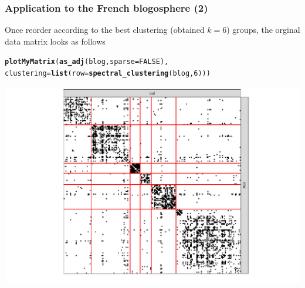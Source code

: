 \documentclass{beamer}\usepackage[]{graphicx}\usepackage[]{color}
\makeatletter
\newcommand{\hlnum}[1]{\textcolor[rgb]{0.686,0.059,0.569}{#1}}%
\newcommand{\hlstd}[1]{\textcolor[rgb]{0.345,0.345,0.345}{#1}}%
\newcommand{\hlkwc}[1]{\textcolor[rgb]{0.333,0.667,0.333}{#1}}%
\newcommand{\hlkwd}[1]{\textcolor[rgb]{0.737,0.353,0.396}{\textbf{#1}}}%
\newenvironment{kframe}{%
 \def\at@end@of@kframe{}%
 \ifinner\ifhmode%
  \def\at@end@of@kframe{\end{minipage}}%
  \begin{minipage}{\columnwidth}%
 \fi\fi%
 \def\FrameCommand##1{\hskip\@totalleftmargin \hskip-\fboxsep
 \colorbox{shadecolor}{##1}\hskip-\fboxsep
     \hskip-\linewidth \hskip-\@totalleftmargin \hskip\columnwidth}%
 \MakeFramed {\advance\hsize-\width
   \@totalleftmargin\z@ \linewidth\hsize
   \@setminipage}}%
 {\par\unskip\endMakeFramed%
 \at@end@of@kframe}
\newenvironment{knitrout}{}{} %
\makeatother
\begin{document}
\begin{frame}[fragile]
  \frametitle{Application to the French blogosphere (2)}

Once reorder according to the best clustering (obtained $k=6$) groups, the orginal data matrix looks as follows

\begin{knitrout}\scriptsize
{}\color{fgcolor}\begin{kframe}
\begin{alltt}
\hlkwd{plotMyMatrix}\hlstd{(}\hlkwd{as_adj}\hlstd{(blog,} \hlkwc{sparse} \hlstd{=} \hlnum{FALSE}\hlstd{),}
  \hlkwc{clustering} \hlstd{=} \hlkwd{list}\hlstd{(}\hlkwc{row} \hlstd{=} \hlkwd{spectral_clustering}\hlstd{(blog,} \hlnum{6}\hlstd{)))}
\end{alltt}
\end{kframe}
\includegraphics[width=.8\textwidth]{figures/unnamed-chunk-9-1} 
\end{knitrout}

\end{frame}

% 
% 
% 
% 
% 
% 
\end{document}

